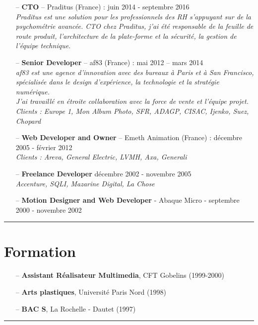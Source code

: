 \documentclass[a4paper,11pt]{article}
\newcommand{\breakvspace}[1]{\pagebreak[2]\vspace{#1}\pagebreak[2]}
\newcommand{\nobreakvspace}[1]{\nopagebreak[4]\vspace{#1}\nopagebreak[4]}
\newcommand{\spacedhrule}[2]{\breakvspace{#1}\hrule\nobreakvspace{#2}}
\begin{document}
  \begin{itemize}
    \item[--]
      \textbf{CTO} – Praditus (France) : juin 2014 - septembre 2016\\
      \textit{Praditus est une solution pour les professionnels des RH s'appuyant sur de la psychométrie avancée. CTO chez Praditus, j'ai été responsable de la feuille de route produit, l'architecture de la plate-forme et la sécurité, la gestion de l'équipe technique.}
    \item[--]
      \textbf{Senior Developer} – af83 (France) : mai 2012 – mars 2014\\
      \textit{af83 est une agence d'innovation avec des bureaux à Paris et à San Francisco, spécialisée dans le design d'expérience, la technologie et la stratégie numérique. \\}
      \textit{J'ai travaillé en étroite collaboration avec la force de vente et l'équipe projet. \\}
      \textit{Clients : Europe 1, Mon Album Photo, SFR, ADAGP, CISAC, Ijenko, Suez, Chopard}
    \item[--]
      \textbf{Web Developer and Owner} – Emeth Animation (France) : décembre 2005 - février 2012\\
      \textit{Clients : Areva, General Electric, LVMH, Axa, Generali}
    \item[--]
      \textbf{Freelance Developer} décembre 2002 - novembre 2005\\
      \textit{Accenture, SQLI, Mazarine Digital, La Chose}
    \item[--]
      \textbf{Motion Designer and Web Developer} - Abaque Micro - septembre 2000 - novembre 2002\\
      \textit{}
  \end{itemize}


\spacedhrule{0.5em}{-0.4em}

\section*{Formation}

\begin{itemize}
  \item[--] \textbf{Assistant Réalisateur Multimedia}, CFT Gobelins (1999-2000)
  \item[--] \textbf{Arts plastiques}, Université Paris Nord (1998)
  \item[--] \textbf{BAC S}, La Rochelle - Dautet (1997)
\end{itemize}

\spacedhrule{0.5em}{-0.4em}
\end{document}
